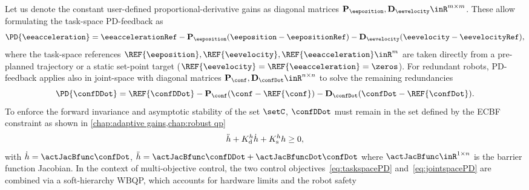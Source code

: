 Let us denote the constant user-defined proportional-derivative gains as diagonal matrices 
$\mathbf{P}_{\eeposition}, \mathbf{D}_{\eevelocity}\inR^{m\times m}$.
These allow formulating the task-space PD-feedback as
\begin{equation}
	\label{eq:taskspacePD}
	\PD{\eeacceleration} =  \eeaccelerationRef-\mathbf{P}_{\eeposition} ( \eeposition - \eepositionRef) 
	- \mathbf{D}_{\eevelocity} (  \eevelocity - \eevelocityRef) ,
\end{equation}
where the task-space references 
$\REF{\eeposition}, \REF{\eevelocity}, \REF{\eeacceleration}\inR^m$
are taken directly from a pre-planned trajectory or a static set-point target ($\REF{\eevelocity}= \REF{\eeacceleration}=\zeros$).
For redundant robots, PD-feedback applies also in joint-space with diagonal matrices $\mathbf{P}_{\conf}, \mathbf{D}_{\confDot}\inR^{n\times n}$ to solve the remaining redundancies
\begin{equation}
	\label{eq:jointspacePD}
	\PD{\confDDot} =  \REF{\confDDot} - \mathbf{P}_{\conf} ({\conf}-\REF{\conf}) 	- \mathbf{D}_{\confDot} ( {\confDot}-\REF{\confDot} ) 	.
\end{equation}
To enforce the forward invariance and asymptotic stability of the set $\setC$, $\confDDot$ must remain in the set defined by the ECBF constraint as shown in \cref{chap:adaptive gains,chap:robust qp}
\begin{equation}\label{eq:ECBF constraint chap5}
	\ddot{h} + K_{\rm d}^{h} \dot{h} + K_{\rm s}^{h} h \geq0,
\end{equation}
with $\dot{h} = \actJacBfunc\confDot$, $ \ddot{h} = \actJacBfunc\confDDot+\actJacBfuncDot\confDot$ where $\actJacBfunc\inR^{1\times n}$ is the barrier function Jacobian.
%
In the context of multi-objective control, the two control objectives~\eqref{eq:taskspacePD} and~\eqref{eq:jointspacePD} are combined via a soft-hierarchy WBQP, which accounts for hardware limits and the robot safety
